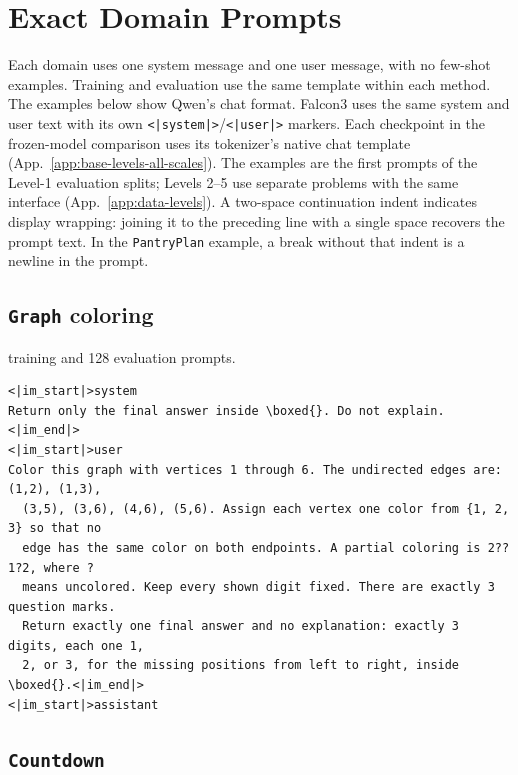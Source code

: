 \documentclass{article}
\newcommand{\1}{\mathbf 1}
\theoremstyle{remark}
\theoremstyle{definition}
\theoremstyle{plain}
\begin{document}
\section{Exact Domain Prompts}
\label{app:prompts}

Each domain uses one system message and one user message, with no few-shot
examples. Training and evaluation use the same template within each method.
The examples below show Qwen's chat format. Falcon3 uses the same system and
user text with its own \texttt{<|system|>}/\texttt{<|user|>} markers. Each
checkpoint in the frozen-model comparison uses its tokenizer's native chat
template (App.~\ref{app:base-levels-all-scales}). The examples are the first
prompts of the Level-1 evaluation splits; Levels 2--5 use separate problems
with the same interface (App.~\ref{app:data-levels}). A two-space continuation
indent indicates display wrapping: joining it to the preceding line with a
single space recovers the prompt text. In the \texttt{PantryPlan} example, a break
without that indent is a newline in the prompt.


\filbreak
\subsection{\texttt{Graph} coloring}
\label{app:prompt-graph}

 training and 128 evaluation prompts.

\begin{Verbatim}[fontsize=\scriptsize,frame=single,framesep=4pt,rulecolor=\color{black!25},samepage=true]
<|im_start|>system
Return only the final answer inside \boxed{}. Do not explain.<|im_end|>
<|im_start|>user
Color this graph with vertices 1 through 6. The undirected edges are: (1,2), (1,3),
  (3,5), (3,6), (4,6), (5,6). Assign each vertex one color from {1, 2, 3} so that no
  edge has the same color on both endpoints. A partial coloring is 2??1?2, where ?
  means uncolored. Keep every shown digit fixed. There are exactly 3 question marks.
  Return exactly one final answer and no explanation: exactly 3 digits, each one 1,
  2, or 3, for the missing positions from left to right, inside \boxed{}.<|im_end|>
<|im_start|>assistant
\end{Verbatim}

\filbreak
\subsection{\texttt{Countdown}}
\label{app:prompt-countdown}
\end{document}
